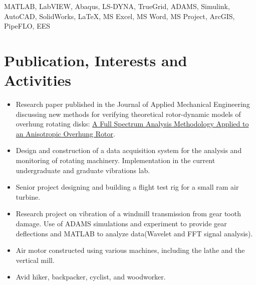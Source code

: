 \documentclass[10pt]{article} %
\begin{document}
 MATLAB\textsuperscript{\textregistered}, LabVIEW, Abaqus, LS-DYNA, TrueGrid, ADAMS, Simulink, AutoCAD, SolidWorks, {\fb \LaTeX}\setmainfont[SmallCapsFont=Fontin SmallCaps]{Fontin-Regular}, MS Excel, MS Word, MS Project, ArcGIS, PipeFLO, EES


\section{Publication, Interests and Activities}

\begin{itemize}
	
	\item \footnotesize{Research paper published in the Journal of Applied Mechanical Engineering discussing new methods for verifying theoretical rotor-dynamic models of overhung rotating disks: \href{https://www.omicsgroup.org/journals/a-full-spectrum-analysis-methodology-applied-to-an-anisotropic-overhung-rotor-2168-9873-1000232.php?aid=81544}{A Full Spectrum Analysis Methodology Applied to an Anisotropic Overhung Rotor}}.
	\item \footnotesize{Design and construction of a data acquisition system for the analysis and  monitoring of rotating machinery. Implementation in the current undergraduate and graduate vibrations lab. }
	\item \footnotesize{Senior project designing and building a flight test rig for a small ram air turbine.}
	\item \footnotesize{Research project on vibration of a windmill transmission from gear tooth damage. Use of ADAMS simulations and experiment to provide gear deflections and MATLAB to analyze data(Wavelet and FFT signal analysis).}
	\item \footnotesize{Air motor constructed using various machines, including the lathe and the vertical mill.}
	\item\footnotesize{Avid hiker, backpacker, cyclist, and woodworker.}
\end{itemize}
\end{document}
